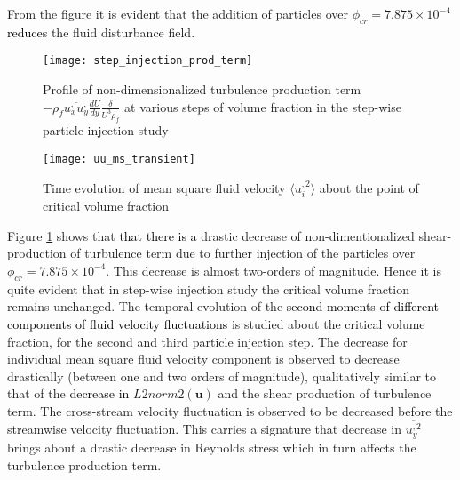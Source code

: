 \documentclass[aip,graphicx]{revtex4-1}
\begin{document}
From the figure it is evident that the addition of particles over $\phi_{cr}=7.875\times10^{-4}$ \textcolor{black}{reduces} the fluid disturbance field.  
\begin{figure}[!]
	\texttt{[image: step\_injection\_prod\_term]}
	\caption{Profile of non-dimensionalized turbulence production term $-\rho_f\overline{u_x^, u_y^,}\frac{dU}{dy}\frac{\delta}{U^3\rho_f}$ at various steps of volume fraction in the step-wise particle injection study} 
	\label{fig:prod_step}
\end{figure}
\begin{figure*}[!]
	\texttt{[image: uu\_ms\_transient]}
	\caption{Time evolution of mean square fluid velocity $\langle{u_i^{,2}}\rangle$ about the point of critical volume fraction} 
	\label{fig:uu_ms}
\end{figure*}
Figure \ref{fig:prod_step} shows that \textcolor{black}{that there is a} drastic decrease of non-dimentionalized shear-production of turbulence term due to further injection of the particles over $\phi_{cr}=7.875\times10^{-4}$. This decrease is almost two-orders of magnitude. Hence it is quite evident that in step-wise injection study the critical volume fraction remains unchanged. The temporal evolution of the \textcolor{black}{second moments of different components of fluid velocity fluctuations} is studied about the critical volume fraction, for the second and third particle injection step. The decrease for individual mean square fluid velocity component is observed to decrease drastically (between one and two orders of magnitude), qualitatively similar to that of the \textcolor{black}{decrease in} $L2norm2(\mathbf u)$ and the shear production of turbulence term. The cross-stream velocity fluctuation is observed to be decreased before the streamwise velocity fluctuation. This carries a signature that decrease in $\overline{u_y^{,2}}$ brings about a drastic decrease in Reynolds stress which in turn affects the turbulence production term.      
\end{document}
